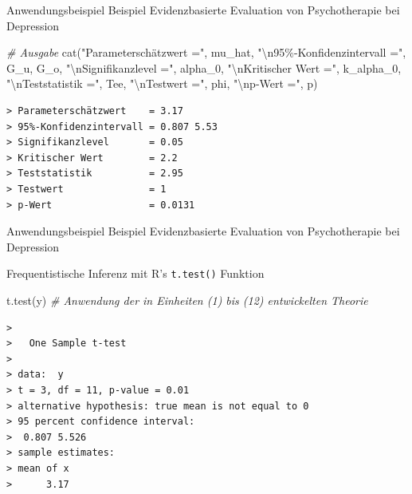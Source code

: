 \documentclass[
  8pt,
  ignorenonframetext,
]{beamer}
\newenvironment{Shaded}{\begin{snugshade}}{\end{snugshade}}
\newcommand{\CommentTok}[1]{\textcolor[rgb]{0.56,0.35,0.01}{\textit{#1}}}
\newcommand{\FunctionTok}[1]{\textcolor[rgb]{0.00,0.00,0.00}{#1}}
\newcommand{\NormalTok}[1]{#1}
\newcommand{\SpecialCharTok}[1]{\textcolor[rgb]{0.00,0.00,0.00}{#1}}
\newcommand{\StringTok}[1]{\textcolor[rgb]{0.31,0.60,0.02}{#1}}
\begin{document}
\begin{frame}[fragile]{Anwendungsbeispiel}
\protect\hypertarget{anwendungsbeispiel-3}{}
Beispiel \textbar{} Evidenzbasierte Evaluation von Psychotherapie bei
Depression

\vspace{4mm}
\footnotesize
{}

\begin{Shaded}
\begin{Highlighting}[]
\CommentTok{\# Ausgabe}
\FunctionTok{cat}\NormalTok{(}\StringTok{"Parameterschätzwert    ="}\NormalTok{, mu\_hat,}
    \StringTok{"}\SpecialCharTok{\textbackslash{}n}\StringTok{95\%{-}Konfidenzintervall ="}\NormalTok{, G\_u, G\_o,}
    \StringTok{"}\SpecialCharTok{\textbackslash{}n}\StringTok{Signifikanzlevel       ="}\NormalTok{, alpha\_0,}
    \StringTok{"}\SpecialCharTok{\textbackslash{}n}\StringTok{Kritischer Wert        ="}\NormalTok{, k\_alpha\_0,}
    \StringTok{"}\SpecialCharTok{\textbackslash{}n}\StringTok{Teststatistik          ="}\NormalTok{, Tee,}
    \StringTok{"}\SpecialCharTok{\textbackslash{}n}\StringTok{Testwert               ="}\NormalTok{, phi,}
    \StringTok{"}\SpecialCharTok{\textbackslash{}n}\StringTok{p{-}Wert                 ="}\NormalTok{, p)}
\end{Highlighting}
\end{Shaded}

\begin{verbatim}
> Parameterschätzwert    = 3.17 
> 95%-Konfidenzintervall = 0.807 5.53 
> Signifikanzlevel       = 0.05 
> Kritischer Wert        = 2.2 
> Teststatistik          = 2.95 
> Testwert               = 1 
> p-Wert                 = 0.0131
\end{verbatim}
\end{frame}

\begin{frame}[fragile]{Anwendungsbeispiel}
\protect\hypertarget{anwendungsbeispiel-4}{}
Beispiel \textbar{} Evidenzbasierte Evaluation von Psychotherapie bei
Depression

\vspace{2mm}
\small

Frequentistische Inferenz mit R's \texttt{t.test()} Funktion
\vspace{2mm}

\footnotesize

\begin{Shaded}
\begin{Highlighting}[]
\FunctionTok{t.test}\NormalTok{(y)         }\CommentTok{\# Anwendung der in Einheiten (1) bis (12) entwickelten Theorie}
\end{Highlighting}
\end{Shaded}

\begin{verbatim}
> 
>   One Sample t-test
> 
> data:  y
> t = 3, df = 11, p-value = 0.01
> alternative hypothesis: true mean is not equal to 0
> 95 percent confidence interval:
>  0.807 5.526
> sample estimates:
> mean of x 
>      3.17
\end{verbatim}
\end{frame}
\end{document}
